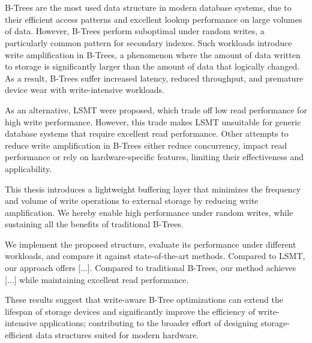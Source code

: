 \chapter{\abstractname}

B-Trees are the most used data structure in modern database systems, due to their efficient access patterns and excellent lookup performance on large volumes of data.
However, B-Trees perform suboptimal under random writes, a particularly common pattern for secondary indexes.
Such workloads introduce write amplification in B-Trees, a phenomenon where the amount of data written to storage is significantly larger than the amount of data that logically changed.
As a result, B-Trees suffer increased latency, reduced throughput, and premature device wear with write-intensive workloads.

As an alternative, \ac{LSMT} were proposed, which trade off low read performance for high write performance.
However, this trade makes \ac{LSMT} unsuitable for generic database systems that require excellent read performance.
Other attempts to reduce write amplification in B-Trees either reduce concurrency, impact read performance or rely on hardware-specific features, limiting their effectiveness and applicability.

This thesis introduces a lightweight buffering layer that minimizes the frequency and volume of write operations to external storage by reducing write amplification.
We hereby enable high performance under random writes, while sustaining all the benefits of traditional B-Trees.

We implement the proposed structure, evaluate its performance under different workloads, and compare it against state-of-the-art methods.
Compared to \ac{LSMT}, our approach offers [...].
Compared to traditional B-Trees, our method achieves [...] while maintaining excellent read performance.

These results suggest that write-aware B-Tree optimizations can extend the lifespan of storage devices and significantly improve the efficiency of write-intensive applications; contributing to the broader effort of designing storage-efficient data structures suited for modern hardware.